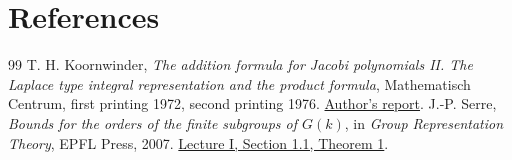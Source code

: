 \documentclass[a4paper,11pt]{article}
\theoremstyle{definition}
\theoremstyle{remark}
\numberwithin{equation}{section}
\begin{document}
\section{References}\label{nav:bibliography-XXII}
\begingroup{}\begin{thebibliography}{99}\small
{} T. H. Koornwinder, \emph{The addition formula for Jacobi polynomials II. The Laplace type integral representation and the product formula}, Mathematisch Centrum, first printing 1972, second printing 1976. \href{https://ir.cwi.nl/pub/12597}{Author's report}.
 J.-P. Serre, \emph{Bounds for the orders of the finite subgroups of \(G(k)\)}, in \emph{Group Representation Theory}, EPFL Press, 2007. \href{https://arxiv.org/pdf/1011.0346}{Lecture I, Section 1.1, Theorem 1}.
\end{thebibliography}\endgroup
\end{document}
